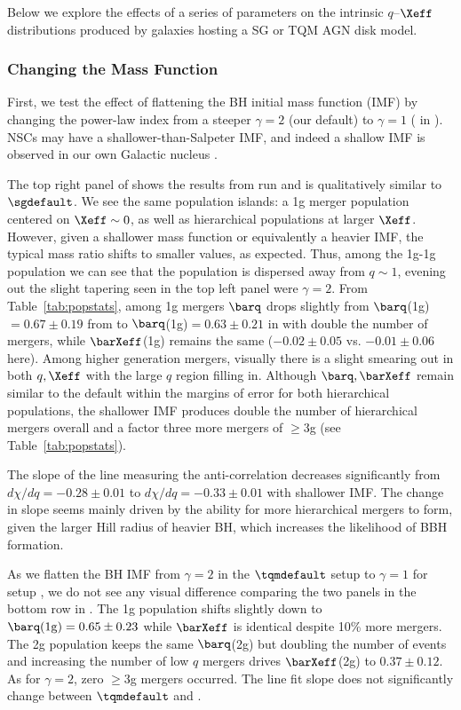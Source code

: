 Below we explore the effects of a series of parameters on the intrinsic $q$--$\Xeff$ distributions produced by galaxies hosting a SG or TQM AGN disk model.


\subsubsection{Changing the Mass Function}
First, we test the effect of flattening the BH initial mass function (IMF) by changing the power-law index from a steeper $\gamma=2$ (our default) to $\gamma=1$ ( in ).
NSCs may have a shallower-than-Salpeter IMF, and indeed a shallow IMF is observed in our own Galactic nucleus \citep[][]{Lu+2013}.

The top right panel of  shows the results from run  and is qualitatively similar to $\sgdefault$.
We see the same population islands: a 1g merger population centered on $\Xeff \sim 0$, as well as hierarchical populations at larger $\Xeff$.
However, given a shallower mass function or equivalently a heavier IMF, the typical mass ratio shifts to smaller values, as expected.
Thus, among the 1g-1g population we can see that the population is dispersed away from $q \sim 1$, evening out the slight tapering seen in the top left panel were $\gamma=2$.
From Table~\ref{tab:popstats}, among 1g mergers $\barq$ drops slightly from $\barq$(1g)$=0.67\pm0.19$ from  to $\barq$(1g)$=0.63\pm0.21$ in  with double the number of mergers, while $\barXeff$(1g) remains the same ($-0.02\pm0.05$ vs. $-0.01\pm0.06$ here).
Among higher generation mergers, visually there is a slight smearing out in both $q,\Xeff$ with the large $q$ region filling in.
Although $\barq,\barXeff$ remain similar to the default within the margins of error for both hierarchical populations, the shallower IMF produces double the number of hierarchical mergers overall and a factor three more mergers of $\geq$3g (see Table~\ref{tab:popstats}).

The slope of the line measuring the anti-correlation decreases significantly from $d\chi/dq=-0.28\pm0.01$ to $d\chi/dq=-0.33\pm0.01$ with shallower IMF.
The change in slope seems mainly driven by the ability for more hierarchical mergers to form, given the larger Hill radius of heavier BH, which increases the likelihood of BBH formation.

As we flatten the BH IMF from $\gamma=2$ in the $\tqmdefault$ setup to $\gamma=1$ for setup , we do not see any visual difference comparing the two panels in the bottom row in .
The 1g population shifts slightly down to $\barq({\rm 1g})=0.65\pm0.23$ while $\barXeff$ is identical despite 10\% more mergers.
The 2g population keeps the same $\barq$(2g) but doubling the number of events and increasing the number of low $q$ mergers drives $\barXeff$(2g) to $0.37\pm0.12$.
As for $\gamma=2$, zero $\geq$3g mergers occurred.
The line fit slope does not significantly change between $\tqmdefault$ and .

